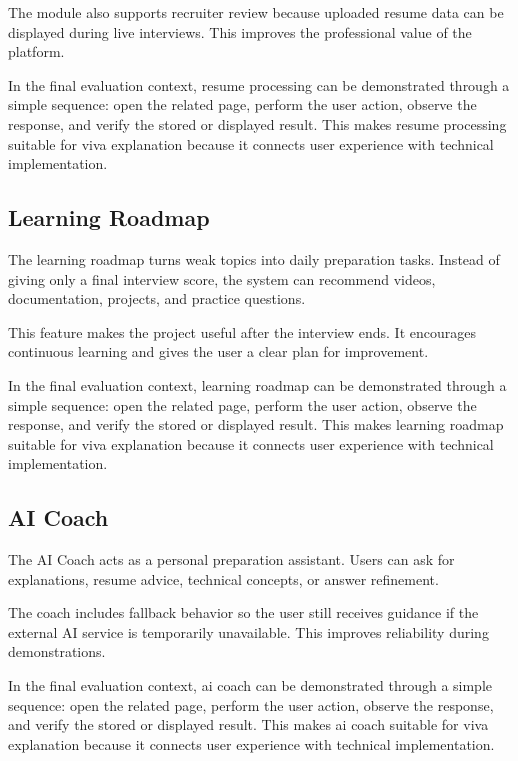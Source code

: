 \documentclass[12pt,a4paper]{report}
\begin{document}
The module also supports recruiter review because uploaded resume data can be displayed during live interviews. This improves the professional value of the platform.

In the final evaluation context, resume processing can be demonstrated through a simple sequence: open the related page, perform the user action, observe the response, and verify the stored or displayed result. This makes resume processing suitable for viva explanation because it connects user experience with technical implementation.

\subsection{Learning Roadmap}

The learning roadmap turns weak topics into daily preparation tasks. Instead of giving only a final interview score, the system can recommend videos, documentation, projects, and practice questions.

This feature makes the project useful after the interview ends. It encourages continuous learning and gives the user a clear plan for improvement.

In the final evaluation context, learning roadmap can be demonstrated through a simple sequence: open the related page, perform the user action, observe the response, and verify the stored or displayed result. This makes learning roadmap suitable for viva explanation because it connects user experience with technical implementation.

\subsection{AI Coach}

The AI Coach acts as a personal preparation assistant. Users can ask for explanations, resume advice, technical concepts, or answer refinement.

The coach includes fallback behavior so the user still receives guidance if the external AI service is temporarily unavailable. This improves reliability during demonstrations.

In the final evaluation context, ai coach can be demonstrated through a simple sequence: open the related page, perform the user action, observe the response, and verify the stored or displayed result. This makes ai coach suitable for viva explanation because it connects user experience with technical implementation.
\end{document}
